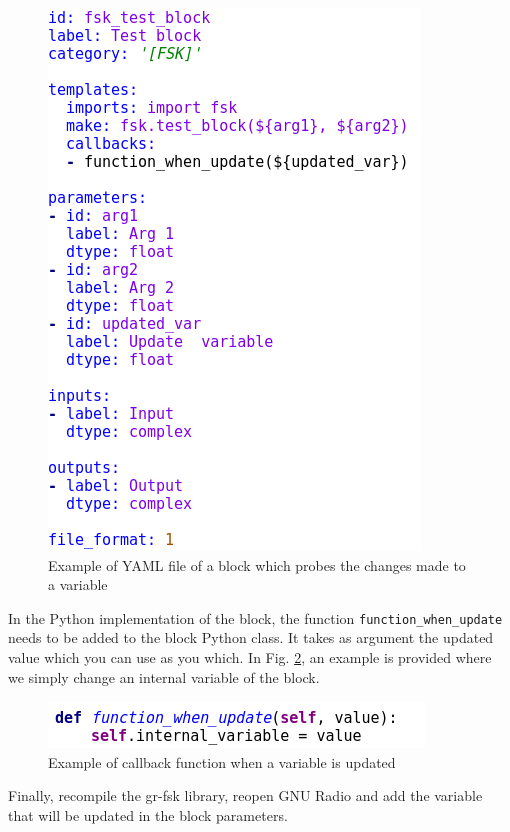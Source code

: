  \begin{figure}[H]
    \centering
    \includegraphics[scale=0.8, left]{figures/Update_yml.png}
    \caption{Example of YAML file of a block which probes the changes made to a variable }
    \label{fig:Update_yml}
\end{figure}


In the Python implementation of the block, the function \texttt{function\_when\_update} needs to be added to the block Python class. It takes as argument the updated value which you can use as you which. In Fig. \ref{fig:Update_python}, an example is provided where we simply change an internal variable of the block.

 \begin{figure}[H]
    \centering
    \includegraphics[scale=0.8, left]{figures/Update_python.png}
    \caption{Example of callback function when a variable is updated}
    \label{fig:Update_python}
\end{figure}

Finally, recompile the gr-fsk library, reopen GNU Radio and add the variable that will be updated in the block parameters.

